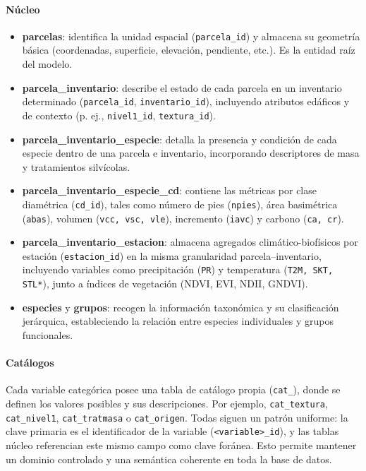 \paragraph{Núcleo}
\begin{itemize}
  \item \textbf{parcelas}: identifica la unidad espacial (\texttt{parcela\_id}) y almacena su geometría básica (coordenadas, superficie, elevación, pendiente, etc.). Es la entidad raíz del modelo.
  \item \textbf{parcela\_inventario}: describe el estado de cada parcela en un inventario determinado (\texttt{parcela\_id}, \texttt{inventario\_id}), incluyendo atributos edáficos y de contexto (p. ej., \texttt{nivel1\_id}, \texttt{textura\_id}).
  \item \textbf{parcela\_inventario\_especie}: detalla la presencia y condición de cada especie dentro de una parcela e inventario, incorporando descriptores de masa y tratamientos silvícolas.
  \item \textbf{parcela\_inventario\_especie\_cd}: contiene las métricas por clase diamétrica (\texttt{cd\_id}), tales como número de pies (\texttt{npies}), área basimétrica (\texttt{abas}), volumen (\texttt{vcc, vsc, vle}), incremento (\texttt{iavc}) y carbono (\texttt{ca, cr}).
  \item \textbf{parcela\_inventario\_estacion}: almacena agregados climático-biofísicos por estación (\texttt{estacion\_id}) en la misma granularidad parcela–inventario, incluyendo variables como precipitación (\texttt{PR}) y temperatura (\texttt{T2M, SKT, STL*}), junto a índices de vegetación (NDVI, EVI, NDII, GNDVI).
  \item \textbf{especies} y \textbf{grupos}: recogen la información taxonómica y su clasificación jerárquica, estableciendo la relación entre especies individuales y grupos funcionales.
\end{itemize}

\paragraph{Catálogos}
Cada variable categórica posee una tabla de catálogo propia (\texttt{cat\_}), donde se definen los valores posibles y sus descripciones. Por ejemplo, \texttt{cat\_textura}, \texttt{cat\_nivel1}, \texttt{cat\_tratmasa} o \texttt{cat\_origen}. Todas siguen un patrón uniforme: la clave primaria es el identificador de la variable (\texttt{<variable>\_id}), y las tablas núcleo referencian este mismo campo como clave foránea. Esto permite mantener un dominio controlado y una semántica coherente en toda la base de datos.

